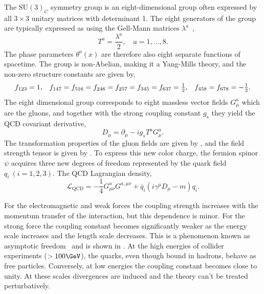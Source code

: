The $\text{SU}(3)_C$ symmetry group is an eight-dimensional group often expressed by all $3 \times 3$ unitary matrices with determinant 1.
The eight generators of the group are typically expressed as using the Gell-Mann matrices $\lambda^a$~\cite{GellManMatrix},
\begin{equation}
	\label{eq:su3_generators}
	T^a = \frac{\lambda^a}{2}, \quad a = 1, \ldots, 8.
\end{equation}
The phase parameters $\theta^a(x)$ are therefore also eight separate functions of spacetime.
The group is non-Abelian, making it a Yang-Mills theory, and the non-zero structure constants are given by,
\begin{equation}
	\label{eq:qcd_sc}
	\begin{array}{ccc}
		f_{123} = 1 ,                                                            & \hspace{\stretch{1}}
		f_{147} = f_{516} = f_{246} = f_{257} = f_{345} = f_{637} = \frac{1}{2}, & \hspace{\stretch{1}}
		f_{458} = f_{678} = -\frac{1}{2}.
	\end{array}
\end{equation}
The eight dimensional group corresponds to eight massless vector fields $G_\mu^a$ which are the gluons, and together with the strong coupling constant $g_s$ they yield the QCD covariant derivative,
\begin{equation}
	\label{eq:qcd_covariant_derivative}
	D_\mu = \partial_\mu - i g_s T^a G_\mu^a.
\end{equation}
The transformation properties of the gluon fields are given by , and the field strength tensor is given by .
To express this new color charge, the fermion spinor $\psi$ acquires three new degrees of freedom represented by the quark field $q_i\:(i = 1, 2, 3)$.
The QCD Lagrangian density,
\begin{equation}
	\label{eq:qcd_lagrangian}
	\mathcal{L}_\text{QCD} = -\frac{1}{4} G_{\mu\nu}^a G^{a,\mu\nu} + \bar q_i (i \gamma^\mu D_\mu - m) q_i.
\end{equation}

For the electromagnetic and weak forces the coupling strength increases with the momentum transfer of the interaction, but this dependence is minor.
For the strong force the coupling constant becomes significantly weaker as the energy scale increases and the length scale decreases.
This is a phenomenon known as asymptotic freedom~\cite{PriceAsymptoticFreedom} and is shown in .
At the high energies of collider experiments ($ > 100 \GeV$), the quarks, even though bound in hadrons, behave as free particles.
Conversely, at low energies the coupling constant becomes close to unity.
At these scales divergences are induced and the theory can't be treated perturbatively.

